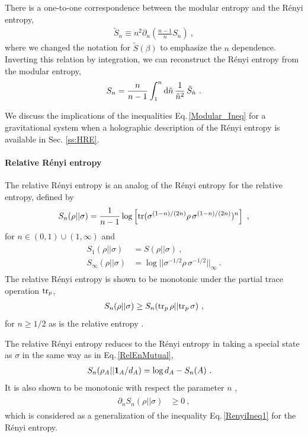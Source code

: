 There is a one-to-one correspondence between the modular entropy and the R{\'e}nyi entropy,
\begin{align}\label{Modular_entropy}
	\tilde S_n \equiv n^2 \partial_n \left( \frac{n-1}{n} S_n\right) \ ,
\end{align}
where we changed the notation for $\tilde S(\beta)$ to emphasize the $n$ dependence.
Inverting this relation by integration, we can reconstruct the R{\'e}nyi entropy from the modular entropy,
\begin{align}\label{Renyi_Modular}
	S_n = \frac{n}{n-1} \int_1^n \mathrm{d}\hat n\, \frac{1}{\hat n^2}\, \tilde S_{\hat n} \ .
\end{align}

We discuss the implications of the inequalities Eq.\,\eqref{Modular_Ineq} for a gravitational system when a holographic description of the R{\'e}nyi entropy is available in Sec. \ref{ss:HRE}.



\paragraph{Relative R{\'e}nyi entropy}
The relative R{\'e}nyi entropy is an analog of the R{\'e}nyi entropy for the relative entropy, defined by \cite{muller2013quantum,wilde2013strong}
\begin{align}
S_n( \rho ||\sigma) =
\frac{1}{n-1} \log\left[ {\rm tr} (\sigma^{(1-n)/(2n)} \rho \,\sigma^{(1-n)/(2n)})^n \right] \ , 
\end{align}
for $n \in (0,1) \cup (1,\infty)$ and 
\begin{align}
\begin{aligned}
	S_1( \rho ||\sigma) &= S( \rho ||\sigma)\ , \\
	S_\infty( \rho ||\sigma) &= \log || \sigma^{-1/2} \rho\, \sigma^{-1/2} ||_\infty  \ .
\end{aligned}
\end{align}
The relative R{\'e}nyi entropy is shown to be monotonic under the partial trace operation ${\rm tr}_p$,
\begin{align}
S_n( \rho ||\sigma) \ge S_n( {\rm tr}_p \,\rho || {\rm tr}_p\, \sigma) \ ,
\end{align}
for $n\ge 1/2$ as is the relative entropy \cite{frank2013monotonicity,beigi2013sandwiched}.

The relative R{\'e}nyi entropy reduces to the R{\'e}nyi entropy in taking a special state as $\sigma$ in the same way as in Eq.\,\eqref{RelEnMutual}, 
\begin{align}
\begin{aligned}
	S_n(\rho_A || {\bf 1}_A/d_A) &= \log d_A - S_n(A) \ .
\end{aligned}
\end{align}
It is also shown to be monotonic with respect the parameter $n$ \cite{muller2013quantum,beigi2013sandwiched},
\begin{align}
\begin{aligned}
	\partial_n S_n(\rho ||\sigma) &\ge 0 \ ,
\end{aligned}
\end{align}
which is considered as a generalization of the inequality Eq.\,\eqref{RenyiIneq1} for the R{\'e}nyi entropy.

